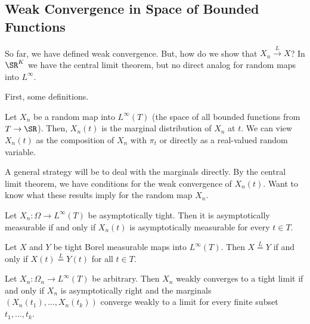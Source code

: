\subsection{Weak Convergence in Space of Bounded Functions}%
\label{subsec:vdv1.5}

So far, we have defined weak convergence. But, how do we show that \(X_n \overset{L}{\to}X\)? In \(\SR^K\) we have the central limit theorem, but no direct analog for random maps into \(L^\infty\).

First, some definitions. 

\begin{definition}
	\label{def:marginalRV}
	Let \(X_n\) be a random map into  \(L^\infty(T)\) (the space of all bounded functions from \(T\to\SR\)). Then, \(X_n(t)\) is the marginal distribution of  \(X_n\) at  \(t\). We can view  \(X_n(t)\) as the composition of  \(X_n\) with  \(\pi_t\) or directly as a real-valued random variable.
\end{definition}

A general strategy will be to deal with the marginals directly. By the central limit theorem, we have conditions for the weak convergence of \(X_n(t)\). Want to know what these results imply for the random map \(X_n\).

\begin{lemma}
	\label{lemma:vdv1.5.1}
	Let \(X_n:\Omega \to L^\infty(T)\) be asymptotically tight. Then it is asymptotically measurable if and only if  \(X_n(t)\) is asymptotically measurable for every  \(t \in T\).	
\end{lemma}

\begin{lemma}
	\label{lemma:vdv1.5.3}
	Let \(X\) and  \(Y\) be tight Borel measurable maps into \(L^\infty(T)\). Then  \(X \overset{L}{=}Y\) if and only if \(X(t)\overset{L}{=}Y(t)\) for all \(t\in T\).	
\end{lemma}

\begin{theorem}
	\label{thm:vdv1.5.4}
	Let \(X_n:\Omega_n \to L^\infty(T)\) be arbitrary. Then \(X_n\) weakly converges to a tight limit if and only if  \(X_n\) is asymptotically right and the marginals  \(\left(X_n(t_1),\dots,X_n(t_k)\right)\) converge weakly to a limit for every finite subset \(t_1,\dots,t_k\).	
\end{theorem}

